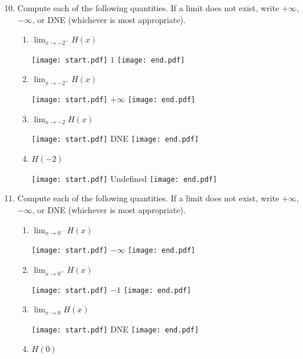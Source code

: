 \documentclass[12pt]{article}
\begin{document}
\begin{enumerate}
\setcounter{enumi}{9}

\item Compute each of the following quantities.  If a limit does not exist, write $+\infty$, $-\infty$, or DNE (whichever is most appropriate). 

\begin{enumerate}

\item $\displaystyle \lim_{x \rightarrow -2^{-}}{H(x)}$

\texttt{[image: start.pdf]}
{{$1$}}
\texttt{[image: end.pdf]}


\item $\displaystyle \lim_{x \rightarrow -2^{+}}{H(x)}$

\texttt{[image: start.pdf]}
{{$+\infty$}}
\texttt{[image: end.pdf]}


\item $\displaystyle \lim_{x \rightarrow -2}{H(x)}$

\texttt{[image: start.pdf]}
{{DNE}}
\texttt{[image: end.pdf]}


\item $H(-2)$

\texttt{[image: start.pdf]}
{{Undefined}}
\texttt{[image: end.pdf]}


\end{enumerate}

\item Compute each of the following quantities.  If a limit does not exist, write $+\infty$, $-\infty$, or DNE (whichever is most appropriate). 

\begin{enumerate}

\item $\displaystyle \lim_{x \rightarrow 0^{-}}{H(x)}$

\texttt{[image: start.pdf]}
{{$-\infty$}}
\texttt{[image: end.pdf]}


\item $\displaystyle \lim_{x \rightarrow 0^{+}}{H(x)}$

\texttt{[image: start.pdf]}
{{$-1$}}
\texttt{[image: end.pdf]}


\item $\displaystyle \lim_{x \rightarrow 0}{H(x)}$

\texttt{[image: start.pdf]}
{{DNE}}
\texttt{[image: end.pdf]}


\item $H(0)$


\end{enumerate}
\end{enumerate}
\end{document}
